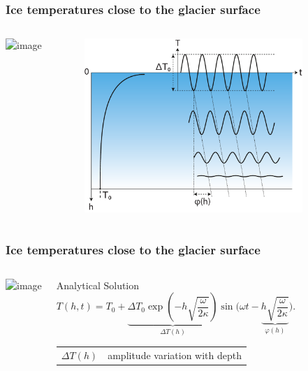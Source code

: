\documentclass[hide notes,intlimits,handout]{beamer}
\begin{document}
\begin{frame}
  \frametitle{Ice temperatures close to the glacier surface}
  \begin{columns}
    \column[T]{1.75cm} 
    \vspace{1cm}
    {\includegraphics<1>[width=1.5cm]{figures/glaciersv_c}}%
    \vspace{2.5cm}
    \column[T]{10.25cm}
    \begin{figure}
    \includegraphics[width=8.25cm]{figures/temp-attenuation}
   \end{figure}
 \end{columns}  
\end{frame}


\begin{frame}
  \frametitle{Ice temperatures close to the glacier surface}
  \begin{columns}
    \column[T]{1.75cm} 
    \vspace{1cm}
    {\includegraphics<1>[width=1.5cm]{figures/glaciersv_c}}%
    \vspace{2.5cm}
    \column[T]{10.25cm}
    \begin{block}{Analytical Solution}
      \begin{equation*}
        \label{eq:heat-flow-1d-solution}
        T(h,t) = T_0 + \underbrace{\Delta T_0 \exp\left(-h \sqrt{\frac{\omega}{2\kappa}}\right)}_{\Delta T(h)}
        \sin\Big(\omega t - \underbrace{h \sqrt{\frac{\omega}{2\kappa}}}_{\varphi(h)}\Big).
      \end{equation*}
      \begin{tabular}{cl}
        $\Delta T(h)$ & amplitude variation with depth 
      \end{tabular}
    \end{block}
  \end{columns}  
\end{frame}
\end{document}
